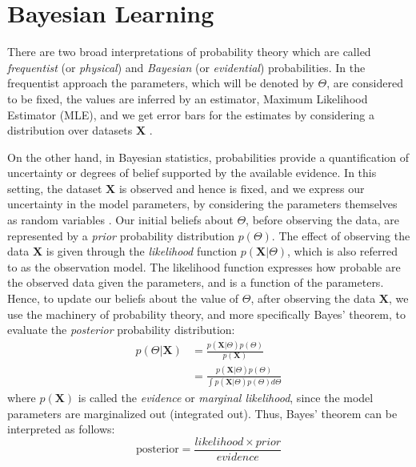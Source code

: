 \section{Bayesian Learning} \label{bayesian-learning-section}

There are two broad interpretations of probability theory which are called \emph{frequentist} (or \emph{physical}) and \emph{Bayesian} (or \emph{evidential}) probabilities. In the frequentist approach the parameters, which will be denoted by $\Theta$, are considered to be fixed, the values are inferred by an estimator, \eg Maximum Likelihood Estimator (MLE), and we get error bars for the estimates by considering a distribution over datasets $\mathbf{X}$ \cite[Ch. 1]{Bishop2006}. 

On the other hand, in Bayesian statistics, probabilities provide a quantification of uncertainty or degrees of belief supported by the available evidence. In this setting, the dataset $\mathbf{X}$ is observed and hence is fixed, and we express our uncertainty in the model parameters, by considering the parameters themselves as random variables \cite[Ch. 1]{Bishop2006}. Our initial beliefs about $\Theta$, before observing the data, are represented by a \emph{prior} probability distribution $p(\Theta)$. The effect of observing the data $\mathbf{X}$ is given through the \emph{likelihood} function $p(\mathbf{X}|\Theta)$, which is also referred to as the observation model. The likelihood function expresses how probable are the observed data given the parameters, and is a function of the parameters. Hence, to update our beliefs about the value of $\Theta$, after observing the data $\mathbf{X}$, we use the machinery of probability theory, and more specifically Bayes' theorem, to evaluate the \emph{posterior} probability distribution:
\begin{equation}
  \begin{aligned}
	p(\Theta | \mathbf{X}) & = \frac{p(\mathbf{X}|\Theta) p(\Theta)}{p(\mathbf{X})} \\
	& = \frac{p(\mathbf{X}|\Theta) p(\Theta)}{\int p(\mathbf{X}|\Theta) p(\Theta) d\Theta}
  \end{aligned}
\end{equation}
where $p(\mathbf{X})$ is called the \emph{evidence} or \emph{marginal likelihood}, since the model parameters are marginalized out (\ie integrated out). Thus, Bayes' theorem can be interpreted as follows:
\begin{equation}
	\text{posterior} = \frac{likelihood \times prior}{evidence}
\end{equation}

